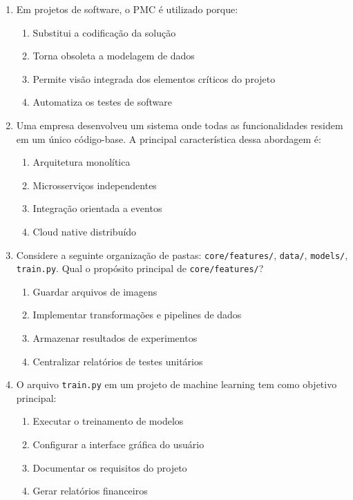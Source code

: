 \documentclass[12pt,a4paper]{article}
\begin{document}
\begin{enumerate}
\item Em projetos de software, o PMC é utilizado porque:
\begin{enumerate}[label=\alph*)]
\item Substitui a codificação da solução
\item Torna obsoleta a modelagem de dados
\item Permite visão integrada dos elementos críticos do projeto
\item Automatiza os testes de software
\end{enumerate}

\item Uma empresa desenvolveu um sistema onde todas as funcionalidades residem em um único código-base. A principal característica dessa abordagem é:
\begin{enumerate}[label=\alph*)]
\item Arquitetura monolítica
\item Microsserviços independentes
\item Integração orientada a eventos
\item Cloud native distribuído
\end{enumerate}

\item Considere a seguinte organização de pastas: \texttt{core/features/}, \texttt{data/}, \texttt{models/}, \texttt{train.py}. Qual o propósito principal de \texttt{core/features/}?
\begin{enumerate}[label=\alph*)]
\item Guardar arquivos de imagens
\item Implementar transformações e pipelines de dados
\item Armazenar resultados de experimentos
\item Centralizar relatórios de testes unitários
\end{enumerate}

\item O arquivo \texttt{train.py} em um projeto de machine learning tem como objetivo principal:
\begin{enumerate}[label=\alph*)]
\item Executar o treinamento de modelos
\item Configurar a interface gráfica do usuário
\item Documentar os requisitos do projeto
\item Gerar relatórios financeiros
\end{enumerate}


\end{enumerate}
\end{document}
